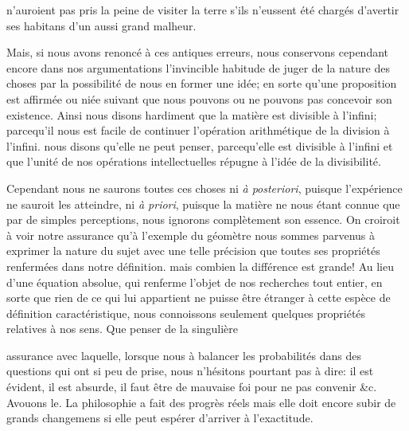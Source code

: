 \documentclass[11pt,a4paper]{article}
\begin{document}
n'auroient pas  pris la peine de visiter la terre s'ils
n'eussent été chargés  d'avertir ses habitans d'un
aussi grand malheur.

Mais, si nous avons renoncé à ces antiques erreurs, nous conservons
cependant encore dans nos argumentations l'invincible habitude de juger
de la nature des choses par la possibilité de nous en former une idée;
en sorte qu'une proposition est affirmée ou niée suivant que nous
pouvons ou ne pouvons pas concevoir son existence. Ainsi nous disons
hardiment que la matière est divisible à l'infini; parcequ'il nous est
facile de continuer l'opération arithmétique de la division à l'infini.
nous disons qu'elle ne peut penser, parcequ'elle est divisible à
l'infini et que l'unité de nos opérations intellectuelles répugne à
l'idée de la divisibilité.

Cependant nous ne saurons toutes ces choses ni \emph{à posteriori},
puisque l'expérience ne sauroit les atteindre, ni \emph{à priori},
puisque la matière ne nous  étant connue que par de simples
perceptions,  nous ignorons complètement
son essence. On croiroit à voir notre assurance qu'à l'exemple du
géomètre nous sommes parvenus à exprimer la nature du sujet avec une
telle précision que toutes ses propriétés  renfermées dans
notre définition. mais combien la différence est grande! Au lieu d'une
équation absolue, qui renferme l'objet de nos recherches tout entier, en
sorte que rien de ce qui lui appartient ne puisse être étranger à cette
espèce de définition caractéristique, nous connoissons seulement quelques
propriétés relatives à nos sens. Que penser de la singulière

assurance  avec laquelle, lorsque nous
 à balancer  les probabilités 
dans des questions qui ont si peu de prise,  nous n'hésitons pourtant pas à dire: il est évident, il est
absurde, il faut être de mauvaise foi pour ne pas convenir \&c.
Avouons le. La philosophie a  fait 
des progrès réels mais  elle doit encore subir de
grands changemens si elle peut espérer d'arriver à l'exactitude.
\end{document}
